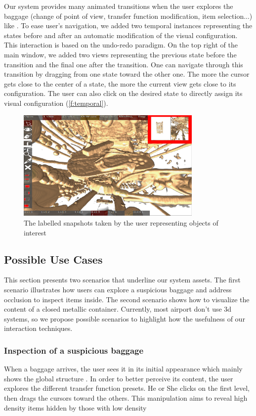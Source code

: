 Our system provides many animated transitions when the user explores the baggage (change of point of view, transfer function modification, item selection...) like \cite{tversky_animation:_2002}. To ease user's navigation, we added two temporal instances representing the states before and after an automatic modification of the visual configuration. This interaction is based on the undo-redo paradigm. On the top right of the main window, we added two views representing the previous state before the transition and the final one after the transition. One can navigate through this transition by dragging from one state toward the other one. The more the cursor gets close to the center of a state, the more the current view gets close to its configuration. The user can also click on the desired state to directly assign its visual configuration (\autoref{f:temporal}).
 \begin{figure}
 \centering
	\includegraphics[width=9cm]{Figures/temporal.png}
	\caption{ The labelled snapshots taken by the user representing objects of interest}
	\label{f:temporal}
\end{figure}

\subsection{Possible Use Cases}

This section presents two scenarios that underline our system assets. The first scenario illustrates how users can explore a suspicious baggage and address occlusion to inspect items inside. The second scenario shows how to visualize the content of a closed metallic container. Currently, most airport don't use 3d systems, so we propose possible scenarios to highlight  how the usefulness of our interaction techniques.

\subsubsection{	Inspection of a suspicious baggage }
When a baggage arrives, the user sees it in its initial appearance which mainly shows the global structure . In order to better perceive its content, the user explores  the different transfer function presets. He or She clicks on the first level, then drags the cursors toward the others. This manipulation aims to reveal high density items hidden by those with low density 

